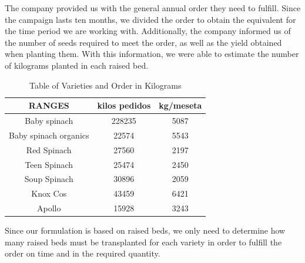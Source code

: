 The company provided us with the general annual order they need to fulfill. Since the campaign lasts ten months, we divided the order  
to obtain the equivalent for the time period we are working with. Additionally, the company informed us of the number of seeds  
required to meet the order, as well as the yield obtained when planting them.  
With this information, we were able to estimate the number of kilograms planted in each raised bed.
\begin{table}[ht!]
    \centering
    \begin{minipage}{0.48\textwidth}
        \centering
        \begin{tabular}{|c|c|c|}
            \hline
            \rowcolor{gray!30} \textbf{\textcolor{grey3}{RANGES}} & \textbf{\textcolor{grey3}{kilos pedidos}} & \textbf{\textcolor{grey3}{kg/meseta}}\\\hline 
            \hline
            Baby spinach   & 228235 & 5087\\ \hline
            Baby spinach organics  & 22574 & 5543\\ \hline
            Red Spinach              & 27560 & 2197\\ \hline
            Teen Spinach           & 25474 & 2450\\ \hline
            Soup Spinach & 30896 & 2059\\ \hline
            Knox Cos     & 43459 & 6421\\ \hline
            Apollo      & 15928 & 3243 \\          
            \hline
        \end{tabular}
        \caption{Table of Varieties and Order in Kilograms}
        \label{tab:Variedades-kilos}
    \end{minipage}
    \hfill
\end{table}

Since our formulation is based on raised beds, we only need to determine how many raised beds must be transplanted for each variety  
in order to fulfill the order on time and in the required quantity.

